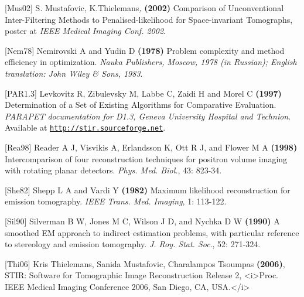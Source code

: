 \documentclass{article}
\def\R2Lurl#1#2{\mbox{\href{#1}{\tt #2}}}
\begin{document}
{[}Mus02] S. Mustafovic, K.Thielemans\textit{,} \textbf{(2002)}  Comparison 
of Unconventional Inter-Filtering Methods to Penalised-likelihood 
for Space-invariant Tomographs, poster at \textit{IEEE Medical Imaging 
Conf. 2002}.

{[}Nem78] Nemirovski A and Yudin D \textbf{(1978)} Problem complexity 
and method efficiency in optimization. \textit{Nauka Publishers, 
Moscow, 1978 (in Russian); English translation: John Wiley \& 
Sons, 1983}.


 {[}PAR1.3] Levkovitz R, Zibulevsky M, Labbe C, Zaidi H and Morel 
C \textbf{(1997)} Determination of a Set of Existing Algorithms for 
Comparative Evaluation. \textit{PARAPET documentation for D1.3, Geneva 
University Hospital and Technion}. \\
Available at \R2Lurl{http://stir.sourceforge.net }{http://stir.sourceforge.net}. 



 {[}Rea98] Reader A J, Visvikis A, Erlandsson K, Ott R J, and Flower 
M A \textbf{(1998)} Intercomparison of four reconstruction techniques 
for positron volume imaging with rotating planar detectors. \textit{Phys. 
Med. Biol.}, 43: 823-34.


{[}She82] Shepp L A and Vardi Y \textbf{(1982)} Maximum likelihood reconstruction 
for emission tomography. \textit{IEEE Trans. Med. Imaging}, 1: 113-122.


{[}Sil90] Silverman B W, Jones M C, Wilson J D, and Nychka D W \textbf{(1990)} 
A smoothed EM approach to indirect estimation problems, with 
particular reference to stereology and emission tomography. \textit{J. 
Roy. Stat. Soc}., 52: 271-324. 

{[}Thi06{]} Kris Thielemans, Sanida Mustafovic, Charalampos Tsoumpas \textbf{(2006)},
STIR: Software for Tomographic Image
Reconstruction Release 2, 
<i>Proc. IEEE Medical Imaging Conference 2006, San Diego, CA, USA.</i>
\end{document}
